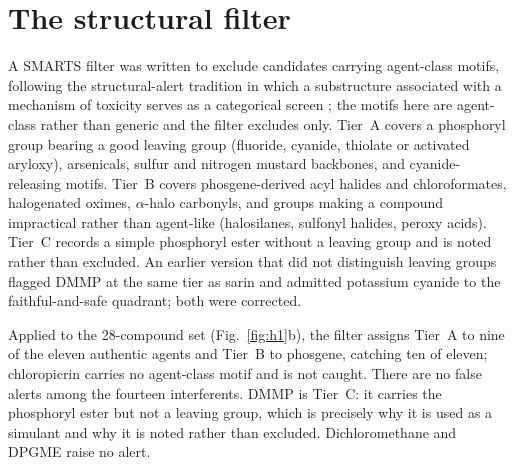 \documentclass[11pt,a4paper]{article}
\begin{document}
\section{The structural filter}
\label{meth:filter}
\label{sec:alerts}
A SMARTS filter was written to exclude candidates carrying agent-class motifs,
following the structural-alert tradition in which a substructure associated with
a mechanism of toxicity serves as a categorical screen \cite{benigni2008,
enoch2011}; the motifs here are agent-class rather than generic and the filter
excludes only. Tier~A covers a phosphoryl group bearing a good leaving group
(fluoride, cyanide, thiolate or activated aryloxy), arsenicals, sulfur and
nitrogen mustard backbones, and cyanide-releasing motifs. Tier~B covers
phosgene-derived acyl halides and chloroformates, halogenated oximes,
$\alpha$-halo carbonyls, and groups making a compound impractical rather than
agent-like (halosilanes, sulfonyl halides, peroxy acids). Tier~C records a
simple phosphoryl ester without a leaving group and is noted rather than
excluded. An earlier version that did not
distinguish leaving groups flagged DMMP at the same tier as sarin and admitted
potassium cyanide to the faithful-and-safe quadrant; both were corrected.


Applied to the 28-compound set (Fig.~\ref{fig:h1}b), the filter assigns Tier~A to nine of the eleven
authentic agents and Tier~B to phosgene, catching ten of eleven; chloropicrin
carries no agent-class motif and is not caught. There are no false alerts among
the fourteen interferents. DMMP is Tier~C: it carries the phosphoryl ester but
not a leaving group, which is precisely why it is used as a simulant and why it
is noted rather than excluded. Dichloromethane and DPGME raise no alert.
\end{document}
